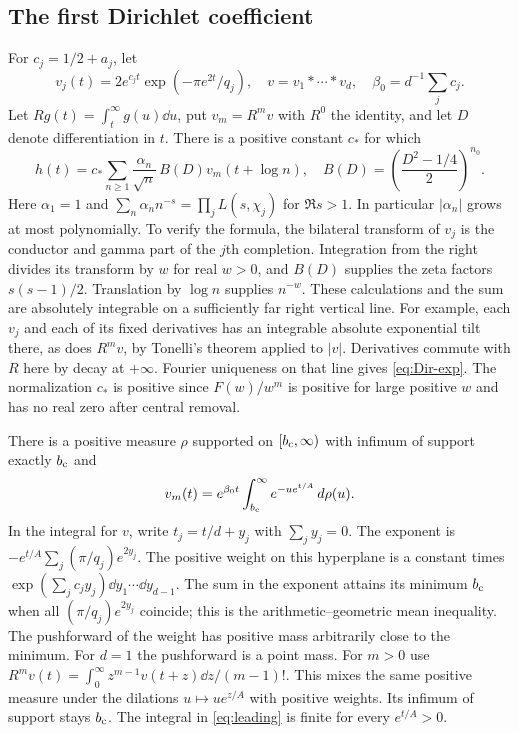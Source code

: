 \subsection*{The first Dirichlet coefficient}
For $c_j=1/2+a_j$, let
\[
 v_j(t)=2e^{c_jt}\exp(-\pi e^{2t}/q_j),\quad
 v=v_1*\cdots*v_d,\quad \beta_0=d^{-1}\sum_j c_j .
\]
Let $Rg(t)=\int_t^\infty g(u)\dd u$, put $v_m=R^m v$ with $R^0$ the identity,
and let $D$ denote differentiation in $t$. There is a positive constant $c_*$ for which
\begin{equation}
 h(t)=c_*\sum_{n\ge1}\frac{\alpha_n}{\sqrt n}\,
             B(D)v_m(t+\log n),\quad
 B(D)=\left(\frac{D^2-1/4}{2}\right)^{n_0}.                 \label{eq:Dir-exp}
\end{equation}
Here $\alpha_1=1$ and $\sum_n\alpha_n n^{-s}=\prod_jL(s,\chi_j)$ for $\Re s>1$. In particular $|\alpha_n|$ grows at most polynomially. To verify the formula, the bilateral transform of $v_j$ is the conductor and gamma part of the $j$th completion. Integration from the right divides its transform by $w$ for real $w>0$, and $B(D)$ supplies the zeta factors $s(s-1)/2$. Translation by $\log n$ supplies $n^{-w}$. These calculations and the sum are absolutely integrable on a sufficiently far right vertical line. For example, each $v_j$ and each of its fixed derivatives has an integrable absolute exponential tilt there, as does $R^m v$, by Tonelli's theorem applied to $|v|$. Derivatives commute with $R$ here by decay at $+\infty$. Fourier uniqueness on that line gives \eqref{eq:Dir-exp}. The normalization $c_*$ is positive since $F(w)/w^m$ is positive for large positive $w$ and has no real zero after central removal.

There is a positive measure $\rho$ supported on $[b_{\mathrm c},\infty)$ with infimum of support exactly $b_{\mathrm c}$ and
\begin{equation}
 v_m(t)=e^{\beta_0 t}\int_{b_{\mathrm c}}^\infty e^{-u e^{t/A}}\,d\rho(u).
 \label{eq:leading}
\end{equation}
In the integral for $v$, write $t_j=t/d+y_j$ with $\sum_jy_j=0$. The exponent is $-e^{t/A}\sum_j(\pi/q_j)e^{2y_j}$. The positive weight on this hyperplane is a constant times $\exp(\sum_j c_j y_j)\dd y_1\cdots\dd y_{d-1}$. The sum in the exponent attains its minimum $b_{\mathrm c}$ when all $(\pi/q_j)e^{2y_j}$ coincide; this is the arithmetic--geometric mean inequality. The pushforward of the weight has positive mass arbitrarily close to the minimum. For $d=1$ the pushforward is a point mass. For $m>0$ use
$R^mv(t)=\int_0^\infty z^{m-1}v(t+z)\dd z/(m-1)!$.
This mixes the same positive measure under the dilations $u\mapsto u e^{z/A}$ with positive weights. Its infimum of support stays $b_{\mathrm c}$. The integral in \eqref{eq:leading} is finite for every $e^{t/A}>0$.


